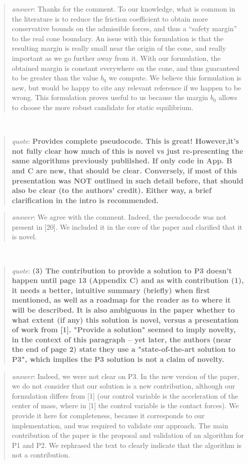 \documentclass[a4paper]{article}
\newcommand\quot[1]{\begin{quote} \textit{quote}: \textbf{#1}\end{quote}}
\newcommand\as[1]{\begin{quote} \textit{answer}: {#1}\end{quote} \leavevmode \\ }
\begin{document}
\as{Thanks for the comment. To our knowledge, what is common in the literature is to reduce the friction coefficient to obtain more conservative bounds on the admissible forces, and thus a ``safety margin'' to the real cone boundary. An issue with this formulation is that the resulting margin is really small near the origin of the cone, and really important as we go further away from it. With our formulation, the obtained margin is constant everywhere on the cone, and thus guaranteed to be greater than the value $b_0$ we compute. We believe this formulation is new, but would be happy to cite any relevant reference if we happen to be wrong. This formulation proves useful to us because the margin $b_0$ allows to choose the more robust candidate for static equilibrium.}

\quot{
Provides complete pseudocode.  This is great! However,it's
not fully clear how much of this is novel vs just re-presenting the
same algorithms previously publilshed.	If only code in App. B and C
are new, that should be clear. Conversely, if most of this presentation
was NOT outlined in such detail before, that should also be clear (to
the authors' credit). Either way, a brief clarification in the intro is
recommended.}

\as{We agree with the comment. Indeed, the pseudocode was not present in [20]. We included it in the core of the paper and clarified that it is novel.}


\quot{(3)	The contribution to provide a solution to P3 doesn't happen
until page 13 (Appendix C) and as with contribution (1), it needs a
better, intuitive summary (briefly) when first mentioned, as well as a
roadmap for the reader as to where it will be described. It is also
ambiguous in the paper whether to what extent (if any) this solution is
novel, versus a presentation of work from [1]. "Provide a solution"
seemed to imply novelty, in the context of this paragraph -- yet later,
the authors (near the end of page 2) state they use a "state-of-the-art
solution to P3", which implies the P3 solution is not a claim of
novelty.}

\as{Indeed, we were not clear on P3. In the new version of the paper, we do not consider that our solution
is a new contribution, although our formulation differs from [1] (our control variable is the acceleration
of the center of mass, where in [1] the control variable is the contact forces). We provide it here for completeness, because it corresponds to our implementation, and 
was required to validate our approach. The main contribution of the paper is the proposal and validation of an algorithm for P1 and P2.
We rephrased the text to clearly indicate that the algorithm is not a contribution. }
\end{document}
